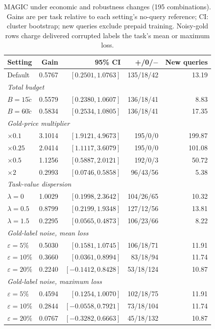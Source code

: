 \documentclass[journal]{IEEEtran}
\newcommand{\smalltable}{\footnotesize\setlength{\tabcolsep}{3.5pt}}
\begin{document}
\begin{table}[t]
\caption{MAGIC under economic and robustness changes (195 combinations). Gains are per task relative to each setting's no-query reference; CI: cluster bootstrap; new queries exclude prepaid training. Noisy-gold rows charge delivered corrupted labels the task's mean or maximum loss.}
\label{tab:sensitivity}\centering\smalltable\setlength{\tabcolsep}{2.5pt}
\begin{tabular}{lrrrr}
\toprule
Setting & Gain & 95\% CI & +/0/$-$ & New queries \\
\midrule
Default & 0.5767 & $[0.2501, 1.0763]$ & 135/18/42 & 13.19 \\
\midrule
\multicolumn{5}{l}{\emph{Total budget}} \\
$B=15\tilde c$ & 0.5579 & $[0.2380, 1.0607]$ & 136/18/41 & 8.83 \\
$B=60\tilde c$ & 0.5834 & $[0.2534, 1.0805]$ & 136/18/41 & 17.35 \\
\midrule
\multicolumn{5}{l}{\emph{Gold-price multiplier}} \\
$\times0.1$ & 3.1014 & $[1.9121, 4.9673]$ & 195/0/0 & 199.87 \\
$\times0.25$ & 2.0414 & $[1.1117, 3.6079]$ & 195/0/0 & 101.08 \\
$\times0.5$ & 1.1256 & $[0.5887, 2.0121]$ & 192/0/3 & 50.72 \\
$\times2$ & 0.2993 & $[0.0746, 0.5858]$ & 96/43/56 & 5.38 \\
\midrule
\multicolumn{5}{l}{\emph{Task-value dispersion}} \\
$\lambda=0$ & 1.0029 & $[0.1998, 2.3642]$ & 104/26/65 & 10.32 \\
$\lambda=0.5$ & 0.8799 & $[0.2199, 1.9348]$ & 127/12/56 & 13.81 \\
$\lambda=1.5$ & 0.2295 & $[0.0565, 0.4873]$ & 106/23/66 & 8.22 \\
\midrule
\multicolumn{5}{l}{\emph{Gold-label noise, mean loss}} \\
$\varepsilon=5\%$ & 0.5030 & $[0.1581, 1.0745]$ & 106/18/71 & 11.91 \\
$\varepsilon=10\%$ & 0.3660 & $[0.0361, 0.8994]$ & 83/18/94 & 11.74 \\
$\varepsilon=20\%$ & 0.2240 & $[-0.1412, 0.8428]$ & 53/18/124 & 10.87 \\
\midrule
\multicolumn{5}{l}{\emph{Gold-label noise, maximum loss}} \\
$\varepsilon=5\%$ & 0.4594 & $[0.1254, 1.0070]$ & 102/18/75 & 11.91 \\
$\varepsilon=10\%$ & 0.2844 & $[-0.0558, 0.7921]$ & 73/18/104 & 11.74 \\
$\varepsilon=20\%$ & 0.0767 & $[-0.3282, 0.6663]$ & 45/18/132 & 10.87 \\
\bottomrule
\end{tabular}
\end{table}
\end{document}
